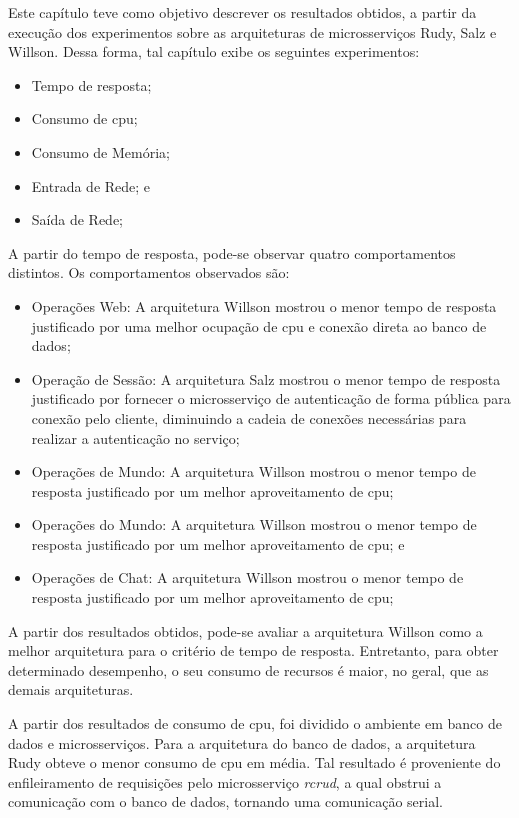 Este capítulo teve como objetivo descrever os resultados obtidos, a partir da execução dos experimentos sobre as arquiteturas de microsserviços Rudy, Salz e Willson.
%
Dessa forma, tal capítulo exibe os seguintes experimentos:

\begin{itemize}
 \item Tempo de resposta;
 \item Consumo de \ac{cpu};
 \item Consumo de Memória;
 \item Entrada de Rede; e
 \item Saída de Rede;
\end{itemize}

A partir do tempo de resposta, pode-se observar quatro comportamentos distintos.
%
Os comportamentos observados são:

\begin{itemize}
 \item Operações Web: A arquitetura Willson mostrou o menor tempo de resposta justificado por uma melhor ocupação de \ac{cpu} e conexão direta ao banco de dados;
 \item Operação de Sessão: A arquitetura Salz mostrou o menor tempo de resposta justificado por fornecer o microsserviço de autenticação de forma pública para conexão pelo cliente, diminuindo a cadeia de conexões necessárias para realizar a autenticação no serviço;
 \item Operações de Mundo: A arquitetura Willson mostrou o menor tempo de resposta justificado por um melhor aproveitamento de \ac{cpu};
 \item Operações do Mundo: A arquitetura Willson mostrou o menor tempo de resposta justificado por um melhor aproveitamento de \ac{cpu}; e
 \item Operações de Chat: A arquitetura Willson mostrou o menor tempo de resposta justificado por um melhor aproveitamento de \ac{cpu};
\end{itemize}

A partir dos resultados obtidos, pode-se avaliar a arquitetura Willson como a melhor arquitetura para o critério de tempo de resposta.
%
Entretanto, para obter determinado desempenho, o seu consumo de recursos é maior, no geral, que as demais arquiteturas.


A partir dos resultados de consumo de \ac{cpu}, foi dividido o ambiente em banco de dados e microsserviços.
%
Para a arquitetura do banco de dados, a arquitetura Rudy obteve o menor consumo de \ac{cpu} em média.
%
Tal resultado é proveniente do enfileiramento de requisições pelo microsserviço \textit{rcrud}, a qual obstrui a comunicação com o banco de dados, tornando uma comunicação serial.

